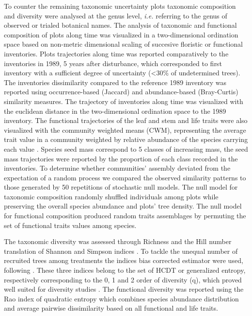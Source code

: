 \documentclass[fleqn,10pt]{ArtEcoFoG} %
\theoremstyle{definition}
\theoremstyle{definition}
\theoremstyle{definition}
\theoremstyle{remark}
\begin{document}
To counter the remaining taxonomic uncertainty plots taxonomic
composition and diversity were analysed at the genus level, \emph{i.e.}
referring to the genus of observed or trialed botanical names. The
analysis of taxonomic and functional composition of plots along time was
visualized in a two-dimensional ordination space based on non-metric
dimensional scaling of succesive floristic or functional inventories.
Plots trajectories along time was reported comparatively to the
inventories in 1989, 5 years after disturbance, which corresponded to
first inventory with a sufficient degree of uncertainty (\textless{}30\%
of undetermined trees). The inventories dissimilarity compared to the
reference 1989 inventory was reported using occurrence-based (Jaccard)
and abundance-based (Bray-Curtis) similarity measures. The trajectory of
inventories along time was visualized with the euclidean distance in the
two-dimensional ordination space to the 1989 inventory. The functional
trajectories of the leaf and stem and life traits were also visualized
with the community weighted means (CWM), representing the average trait
value in a community weighted by relative abundance of the species
carrying each value \citep{Diaz2007, Garnier2004}. Species seed mass
correspond to 5 classes of increasing mass, the seed mass trajectories
were reported by the proportion of each class recorded in the
inventories. To determine whether communities' assembly deviated from
the expectation of a random process we compared the observed similarity
patterns to those generated by 50 repetitions of stochastic null models.
The null model for taxonomic composition randomly shuffled individuals
among plots while preserving the overall species abundance and plots'
tree density. The null model for functional composition produced random
traits assemblages by permuting the set of functional traits values
among species.

The taxonomic diversity was assessed through Richness and the Hill
number translation of Shannon and Simpson indices \citep{Hill1973}. To
tackle the unequal number of recruited trees among treatments the
indices bias corrected estimator were used, following
\citep{Chao2015, Marcon2015b}. These three indices belong to the set of
HCDT or generalized entropy, respectively corresponding to the 0, 1 and
2 order of diversity (q), which proved well suited for diversity studies
\citep{Patil1982, Tothmeresz1995}. The functional diversity was reported
using the Rao index of quadratic entropy which combines species
abundance distribution and average pairwise dissimilarity based on all
functional and life traits.
\end{document}
